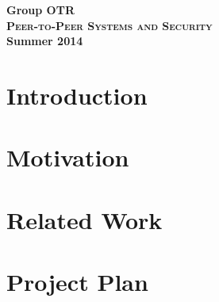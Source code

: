 

\title{}
\author{Markus Teich, Jannik Theiß}
\date{\today}



\begin{titlepage}
    \begin{center}
    \huge \textbf{Group OTR} \\
    \vspace{2cm}
    \LARGE\textbf{\textsc{Peer-to-Peer Systems and Security}}\\
    \vspace{0.5cm}
    \textbf{Summer 2014}
    \vspace{3.5cm}
	\end{center}
\end{titlepage}

\section{Introduction}

\section{Motivation}

\section{Related Work}

\section{Project Plan}



